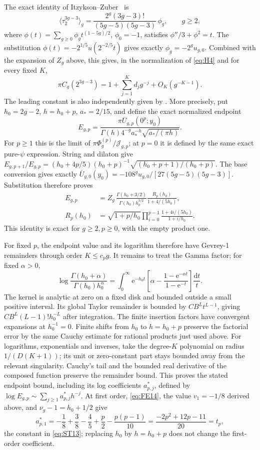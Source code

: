 The exact identity of Itzykson--Zuber~\cite[equation~(6.10)]{IZ} is
\[
 \langle\tau_2^{3g-3}\rangle_g
 =\frac{2^g(3g-3)!}{(5g-5)(5g-3)}\,\phi_g,\qquad g\ge2,
\]
where $\phi(t)=\sum_{g\ge0}\phi_g t^{(1-5g)/2}$, $\phi_0=-1$,
satisfies $\phi''/3+\phi^2=t$. The substitution
$\phi(t)=-2^{1/5}u(2^{-2/5}t)$ gives exactly
$\phi_g=-2^g u_{g,0}$.
Combined with the expansion of $Z_g$ above, this gives, in the normalization of \eqref{eq:H4} and for every fixed $K$,
\begin{equation}
 \pi C_g(2^{3g-3})=1+\sum_{j=1}^K d_jg^{-j}+O_K(g^{-K-1}).
 \label{eq:FE10}
\end{equation}
The leading constant is also independently given by
\cite[Theorem~1]{GYZ}. More precisely, put $h_0=2g-2$, $h=h_0+p$,
$a_*=2/15$, and define the exact normalized endpoint
\[
 E_{g,p}=\frac{\pi\overline U_{g,p}(0^p;y_0)}
 {\Gamma(h)4^{-g}a_*^{-h}\sqrt{a_*/(\pi h)}}.
\]
For $p\ge1$ this is the limit of $\pi\Phi_g^{(p)}/\mathcal J_{g,p}$;
at $p=0$ it is defined by the same exact pure-$\psi$ expression.
String and dilaton give
$E_{g,p+1}/E_{g,p}=(h_0+4p/5)(h_0+p)^{-1}
\sqrt{(h_0+p+1)/(h_0+p)}$. The base conversion gives exactly
$\overline U_{g,0}(y_0)=-108^gu_{g,0}/[27(5g-5)(5g-3)]$.
Substitution therefore proves
\begin{equation}
 \begin{split}
 E_{g,p}&=Z_g\,\frac{\Gamma(h_0+3/2)}{\Gamma(h_0)h_0^{3/2}}
             \frac{R_p(h_0)}{1+4/(5h_0)},\\
 R_p(h_0)&=\sqrt{1+p/h_0}\prod_{i=0}^{p-1}
                       \frac{1+4i/(5h_0)}{1+i/h_0}.
 \end{split}
 \label{eq:FE14}
\end{equation}
This identity is exact for $g\ge2,p\ge0$, with the empty product one.

For fixed $p$, the endpoint value and its logarithm therefore have
Gevrey-1 remainders through order $K\le c_pg$. It remains to treat the
Gamma factor; for fixed $\alpha>0$,
\[
 \log\frac{\Gamma(h_0+\alpha)}{\Gamma(h_0)h_0^\alpha}
 =\int_0^\infty \mathrm{e}^{-h_0t}
 \left[\alpha-\frac{1-\mathrm{e}^{-\alpha t}}{1-\mathrm{e}^{-t}}\right]\frac{\mathrm{d}t}{t}.
\]
The kernel is analytic at zero on a fixed disk and bounded outside a
small positive interval. Its global Taylor remainder is bounded by
$CB^Lt^{L-1}$, giving $CB^L(L-1)!h_0^{-L}$ after integration.
The finite insertion factors have convergent expansions at $h_0^{-1}=0$.
Finite shifts from $h_0$ to $h=h_0+p$ preserve the factorial error by the
same Cauchy estimate for rational products just used above.
For logarithms, exponentials and inverses, take the degree-$K$ polynomial
on radius $1/(D(K+1))$; its unit or zero-constant part stays bounded
away from the relevant singularity. Cauchy's tail and the bounded
real derivative of the composed function preserve the remainder bound.
This proves the stated endpoint bound, including its log coefficients
$a^*_{p,j}$, defined by $\log E_{g,p}\sim\sum_{j\ge1}a^*_{p,j}h^{-j}$.
At first order, \eqref{eq:FE14}, the value $v_1=-1/8$ derived above,
and $\nu_g-1=h_0+1/2$ give
\[
 a^*_{p,1}=-\frac18+\frac38-\frac45+\frac p2-\frac{p(p-1)}{10}
 =\frac{-2p^2+12p-11}{20}=t_p,
\]
the constant in \eqref{eq:ST13}; replacing $h_0$ by $h=h_0+p$ does not
change the first-order coefficient.


